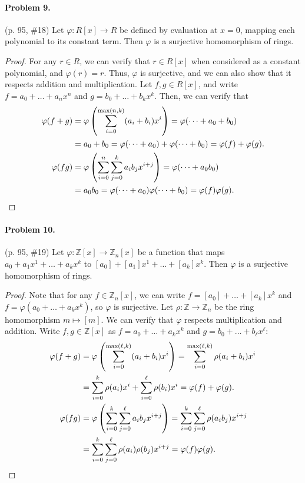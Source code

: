 \documentclass[12pt]{article}
\begin{document}
\paragraph{Problem 9.} (p. 95, \#18)
Let $\varphi : R[x] \to R$ be defined by evaluation at $x = 0$, mapping each polynomial to its constant term. Then $\varphi$ is a surjective homomorphism of rings.

\begin{proof}
    For any $r \in R$, we can verify that $r \in R[x]$ when considered as a constant polynomial, and $\varphi(r) = r$. Thus, $\varphi$ is surjective, and we can also show that it respects addition and multiplication. Let $f, g \in R[x]$, and write $f = a_0 + \dots + a_n x^n$ and $g = b_0 + \dots + b_k x^k$. Then, we can verify that
    \begin{align*} \varphi(f + g) &=  \varphi\left( \sum_{i=0}^{\max(n,k)} (a_i + b_i) x^i\right) = \varphi(\dots + a_0 + b_0) \\ &= a_0 + b_0 = \varphi(\dots + a_0) + \varphi(\dots + b_0) = \varphi(f) + \varphi(g). \\
    \varphi(fg) &= \varphi\left(\sum_{i = 0}^n \sum_{j=0}^k a_i b_j x^{i + j}\right) = \varphi(\dots + a_0b_0) \\ &= a_0 b_0 = \varphi(\dots + a_0) \varphi(\dots + b_0) = \varphi(f)\varphi(g). \qedhere \end{align*}
\end{proof}

\paragraph{Problem 10.} (p. 95, \#19) Let $\varphi : \mathbb Z[x] \to \mathbb Z_n[x]$ be a function that maps $a_0 + a_1x^1 + \dots + a_k x^k$ to $[a_0] + [a_1]x^1 + \dots + [a_k]x^k$. Then $\varphi$ is a surjective homomorphism of rings.

\begin{proof}
    Note that for any $f \in \mathbb Z_n[x]$, we can write $f = [a_0] + \dots + [a_k] x^k$ and $f = \varphi(a_0 + \dots + a_k x^k)$, so $\varphi$ is surjective. Let $\rho : \mathbb Z \to \mathbb Z_n$ be the ring homomorphism $m \mapsto [m]$. We can verify that $\varphi$ respects multiplication and addition. Write $f,g \in \mathbb Z[x]$ as $f = a_0 + \dots + a_k x^k$ and $g = b_0 + \dots + b_\ell x^\ell$:
    \begin{align*}
        \varphi(f +g) &= \varphi\left(\sum_{i=0}^{\max(\ell, k)} (a_i + b_i) x^i \right) =\sum_{i=0}^{\max(\ell, k)} \rho(a_i + b_i) x^i \\ &= \sum_{i=0}^k \rho(a_i) x^i + \sum_{i=0}^\ell \rho(b_i) x^i = \varphi(f) + \varphi(g). \\
        \varphi(fg) &= \varphi\left( \sum_{i = 0}^k \sum_{j=0}^\ell a_i b_j x^{i + j}\right) = \sum_{i = 0}^k \sum_{j=0}^\ell \rho(a_i b_j) x^{i + j} \\ &= \sum_{i = 0}^k \sum_{j=0}^\ell \rho(a_i) \rho(b_j) x^{i + j} = \varphi(f)\varphi(g). \qedhere
    \end{align*}
\end{proof}
\end{document}
